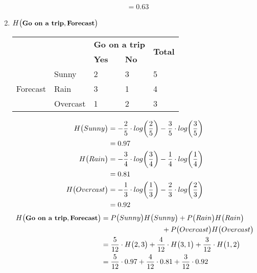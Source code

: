 \documentclass[11pt]{article}
\begin{document}
\begin{enumerate}
\begin{align*}
			&= 0.63
		\end{align*}
		\item $H \big(\small \textbf{Go on a trip},\textbf{Forecast}\big)$  
\begin{table}[!ht]
	\centering
	\begin{tabular}{|l|l|l|l|l|}
		\hline
		\multicolumn{2}{|l|}{\multirow{2}{*}{}} & \multicolumn{2}{l|}{\textbf{Go on a trip}} & \multirow{2}{*}{\textbf{Total}} \\ \cline{3-4}
		\multicolumn{2}{|l|}{}                  & \textbf{Yes}         & \textbf{No}         &                                 \\ \hline
		\multirow{3}{*}{Forecast}   & Sunny    & 2                    & 3                   & 5                               \\ \cline{2-5} 
		& Rain   & 3                    & 1                   & 4                               \\ \cline{2-5} 
		& Overcast   & 1                    & 2                   & 3                               \\ \hline
	\end{tabular}
\end{table}		
\begin{align*}
H \big(\small Sunny\big) &= - \frac{2}{5} \cdot log \bigg(\frac{2}{5} \bigg) - \frac{3}{5} \cdot log \bigg(\frac{3}{5} \bigg) \\
&= 0.97 \\ 
H \big(\small Rain\big) &= - \frac{3}{4} \cdot log \bigg(\frac{3}{4} \bigg) - \frac{1}{4} \cdot log \bigg(\frac{1}{4} \bigg) \\
&= 0.81 \\
H \big(\small Overcast\big) &= - \frac{1}{3} \cdot log \bigg(\frac{1}{3} \bigg) - \frac{2}{3} \cdot log \bigg(\frac{2}{3} \bigg) \\
&= 0.92
\end{align*}
		\begin{align*}
H \big(\small \textbf{Go on a trip},\textbf{Forecast}\big) &=  P \big( Sunny \big) H \big(\small Sunny \big) + P \big(Rain \big) H \big(\small Rain \big)  \\
&\hspace{3cm} + P \big(Overcast \big) H \big(\small Overcast\big) \\
&= \frac{5}{12} \cdot H \big(2, 3\big) + \frac{4}{12} \cdot H \big(3, 1\big) + \frac{3}{12} \cdot H \big(1, 2\big) \\
&= \frac{5}{12} \cdot 0.97 + \frac{4}{12} \cdot 0.81 + \frac{3}{12} \cdot 0.92 \\

\end{align*}
\end{enumerate}
\end{document}
